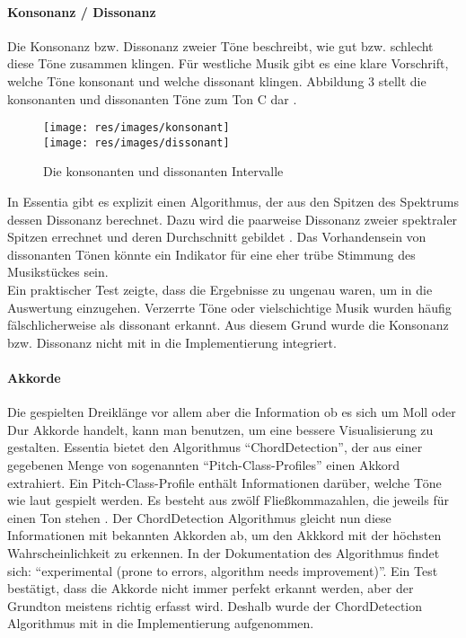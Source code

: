 \documentclass[11pt,a4paper]{article}
\begin{document}
\paragraph{Konsonanz / Dissonanz}
Die Konsonanz bzw. Dissonanz zweier Töne beschreibt, wie gut bzw. schlecht diese Töne zusammen klingen. Für westliche Musik gibt es eine klare Vorschrift, welche Töne konsonant und welche dissonant klingen. Abbildung 3 stellt die konsonanten und dissonanten Töne zum Ton C dar \cite{89a5aac0af37ff45f55cd59468ed3b0a5f30cbb229bb691b7970477c14dbe1af}.
\begin{figure}[ht]
\texttt{[image: res/images/konsonant]}
\vspace{5pt}\\
\texttt{[image: res/images/dissonant]}
\caption[Konsonante und Dissonante Intervalle]{Die konsonanten und dissonanten Intervalle}
\end{figure}
In Essentia gibt es explizit einen Algorithmus, der aus den Spitzen des Spektrums dessen Dissonanz berechnet. Dazu wird die paarweise Dissonanz zweier spektraler Spitzen errechnet und deren Durchschnitt gebildet \cite{EssentiaDissonance}. Das Vorhandensein von dissonanten Tönen könnte ein Indikator für eine eher trübe Stimmung des Musikstückes sein.\\
Ein praktischer Test zeigte, dass die Ergebnisse zu ungenau waren, um in die Auswertung einzugehen. Verzerrte Töne oder vielschichtige Musik wurden häufig fälschlicherweise als dissonant erkannt. Aus diesem Grund wurde die Konsonanz bzw. Dissonanz nicht mit in die Implementierung integriert.

\paragraph{Akkorde}
Die gespielten Dreiklänge vor allem aber die Information ob es sich um Moll oder Dur Akkorde handelt, kann man benutzen, um eine bessere Visualisierung zu gestalten. Essentia bietet den Algorithmus ``ChordDetection'', der aus einer gegebenen Menge von sogenannten ``Pitch-Class-Profiles'' einen Akkord extrahiert. Ein Pitch-Class-Profile enthält Informationen darüber, welche Töne wie laut gespielt werden. Es besteht aus zwölf Fließkommazahlen, die jeweils für einen Ton stehen \cite{e6fe2ea94b8d448139e05e3d36c0ffd5e82905dc87f719492ff3872650c667d9}. Der ChordDetection Algorithmus gleicht nun diese Informationen mit bekannten Akkorden ab, um den Akkkord mit der höchsten Wahrscheinlichkeit zu erkennen. In der Dokumentation des Algorithmus findet sich: ``experimental (prone to errors, algorithm needs improvement)''\cite{EssentiaChordDetection}. Ein Test bestätigt, dass die Akkorde nicht immer perfekt erkannt werden, aber der Grundton meistens richtig erfasst wird. Deshalb wurde der ChordDetection Algorithmus mit in die Implementierung aufgenommen.
\end{document}
